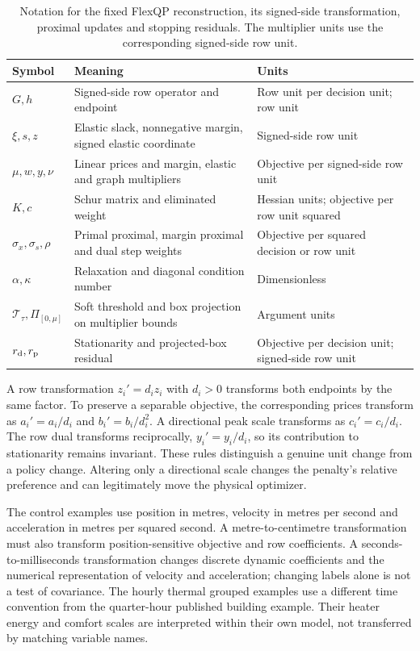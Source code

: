 \begin{table}[htbp]\centering\small
\caption{Notation for the fixed FlexQP reconstruction, its signed-side transformation, proximal updates and stopping residuals. The multiplier units use the corresponding signed-side row unit.}\label{tab:flex-notation}
\begin{tabularx}{\textwidth}{@{}l>{\raggedright\arraybackslash}X>{\raggedright\arraybackslash}X@{}}\toprule
Symbol & Meaning & Units\\\midrule
$G,h$ & Signed-side row operator and endpoint & Row unit per decision unit; row unit\\
$\xi,s,z$ & Elastic slack, nonnegative margin, signed elastic coordinate & Signed-side row unit\\
$\mu,w,y,\nu$ & Linear prices and margin, elastic and graph multipliers & Objective per signed-side row unit\\
$K,c$ & Schur matrix and eliminated weight & Hessian units; objective per row unit squared\\
$\sigma_x,\sigma_s,\rho$ & Primal proximal, margin proximal and dual step weights & Objective per squared decision or row unit\\
$\alpha,\kappa$ & Relaxation and diagonal condition number & Dimensionless\\
$\mathcal T_\tau,\Pi_{[0,\mu]}$ & Soft threshold and box projection on multiplier bounds & Argument units\\
$r_{\rm d},r_{\rm p}$ & Stationarity and projected-box residual & Objective per decision unit; signed-side row unit\\\bottomrule
\end{tabularx}
\end{table}

A row transformation $z_i'=d_i z_i$ with $d_i>0$ transforms both endpoints by the
same factor. To preserve a separable objective, the corresponding prices transform
as $a_i'=a_i/d_i$ and $b_i'=b_i/d_i^2$. A directional peak scale transforms as
$c_i'=c_i/d_i$. The row dual transforms reciprocally, $y_i'=y_i/d_i$, so its
contribution to stationarity remains invariant. These rules distinguish a genuine
unit change from a policy change. Altering only a directional scale changes the
penalty's relative preference and can legitimately move the physical optimizer.

The control examples use position in metres, velocity in metres per second and
acceleration in metres per squared second. A metre-to-centimetre transformation
must also transform position-sensitive objective and row coefficients. A seconds-
to-milliseconds transformation changes discrete dynamic coefficients and the
numerical representation of velocity and acceleration; changing labels alone is
not a test of covariance. The hourly thermal grouped examples use a different
time convention from the quarter-hour published building example. Their heater
energy and comfort scales are interpreted within their own model, not transferred
by matching variable names.

